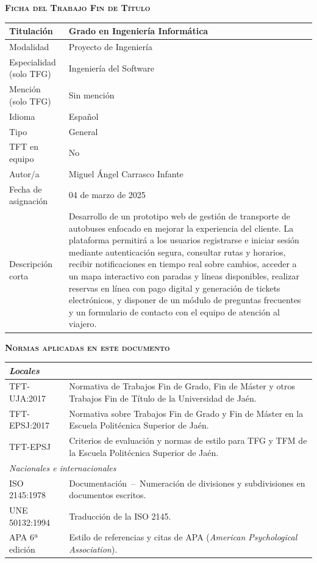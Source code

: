 \textsc{\textbf{Ficha del Trabajo Fin de Título}}
\vspace{0.4cm}

\begin{tabular}{|l|p{10cm}|}
    \hline \hline
    Titulación & Grado en Ingeniería Informática \\ \hline
    Modalidad & Proyecto de Ingeniería \\ \hline
    Especialidad (solo TFG) & Ingeniería del Software \\ \hline
    Mención (solo TFG) & Sin mención \\ \hline
    Idioma & Español \\ \hline
    Tipo & General \\ \hline
    TFT en equipo & No \\ \hline
    Autor/a & Miguel Ángel Carrasco Infante \\ \hline
    Fecha de asignación & 04 de marzo de 2025 \\ \hline
    Descripción corta & Desarrollo de un prototipo web de gestión de transporte de autobuses enfocado en mejorar la experiencia del cliente. La plataforma permitirá a los usuarios registrarse e iniciar sesión mediante autenticación segura, consultar rutas y horarios, recibir notificaciones en tiempo real sobre cambios, acceder a un mapa interactivo con paradas y líneas disponibles, realizar reservas en línea con pago digital y generación de tickets electrónicos, y disponer de un módulo de preguntas frecuentes y un formulario de contacto con el equipo de atención al viajero. \\ \hline
    \hline
\end{tabular}

\vspace{1cm}

\textsc{\textbf{Normas aplicadas en este documento}}
\vspace{0.4cm}

\begin{tabular}{|l|p{9.5cm}|}
    \hline \hline
    \multicolumn{2}{|l|}{\textit{Locales}} \\ \hline
    TFT-UJA:2017  & Normativa de Trabajos Fin de Grado, Fin de Máster y otros Trabajos Fin de Título de la Universidad de Jaén. \\ \hline
    TFT-EPSJ:2017 & Normativa sobre Trabajos Fin de Grado y Fin de Máster en la Escuela Politécnica Superior de Jaén. \\ \hline
    TFT-EPSJ      & Criterios de evaluación y normas de estilo para TFG y TFM de la Escuela Politécnica Superior de Jaén. \\ \hline
    \multicolumn{2}{|l|}{\textit{Nacionales e internacionales}} \\ \hline
    ISO 2145:1978   & Documentación~--~Numeración de divisiones y subdivisiones en documentos escritos. \\ \hline
    UNE 50132:1994  & Traducción de la ISO 2145. \\ \hline
    APA 6ª edición  & Estilo de referencias y citas de APA (\textit{American Psychological Association}). \\ \hline
    \hline
\end{tabular}

